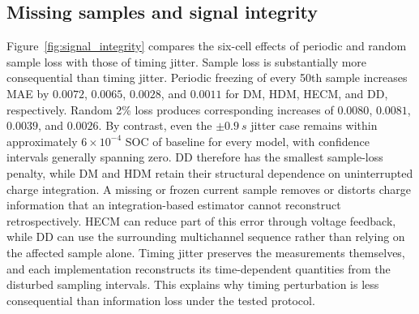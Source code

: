 \documentclass[review,nopreprintline]{elsarticle}
\begin{document}
\subsection{Missing samples and signal integrity}
Figure~\ref{fig:signal_integrity} compares the six-cell effects of periodic and random sample loss with those of timing jitter. Sample loss is substantially more consequential than timing jitter. Periodic freezing of every 50th sample increases MAE by $0.0072$, $0.0065$, $0.0028$, and $0.0011$ for DM, HDM, HECM, and DD, respectively. Random 2\% loss produces corresponding increases of $0.0080$, $0.0081$, $0.0039$, and $0.0026$. By contrast, even the $\pm\SI{0.9}{s}$ jitter case remains within approximately $6\times10^{-4}$ SOC of baseline for every model, with confidence intervals generally spanning zero. DD therefore has the smallest sample-loss penalty, while DM and HDM retain their structural dependence on uninterrupted charge integration. A missing or frozen current sample removes or distorts charge information that an integration-based estimator cannot reconstruct retrospectively. HECM can reduce part of this error through voltage feedback, while DD can use the surrounding multichannel sequence rather than relying on the affected sample alone. Timing jitter preserves the measurements themselves, and each implementation reconstructs its time-dependent quantities from the disturbed sampling intervals. This explains why timing perturbation is less consequential than information loss under the tested protocol.
\end{document}
